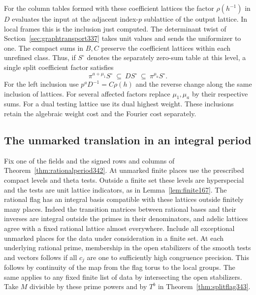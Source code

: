 \documentclass[a4paper,11pt]{article}
\theoremstyle{definition}
\theoremstyle{remark}
\numberwithin{equation}{section}
\begin{document}
For the column tables formed with these coefficient lattices the
factor \(\rho(h^{-1})\) in \(D\) evaluates the input at the adjacent
index-\(p\) sublattice of the output lattice. In local frames this
is the inclusion just computed. The determinant twist of
Section~\ref{sec:graphtransport337} takes unit values and sends the
uniformizer to one. The compact sums in \(B,C\) preserve the
coefficient lattices within each unrefined class. Thus, if \(S^\circ\)
denotes the separately zero-sum table at this level, a single split
coefficient factor satisfies
\[
             \pi^{a+\mu_1} S^\circ\ \subseteq\ D S^\circ
                                      \ \subseteq\ \pi^{\mu_a}S^\circ .
\]
For the left inclusion use \(p^aD^{-1}=C\rho(h)\) and the reverse
change along the same inclusion of lattices. For several affected
factors replace \(\mu_1,\mu_a\) by their respective sums. For a
dual testing lattice use its dual highest weight. These inclusions
retain the algebraic weight cost and the Fourier cost separately.


\subsection{The unmarked translation in an integral period}\label{sec:splittranslation343}
Fix one of the fields and the signed rows and columns of
Theorem~\ref{thm:rationalperiod342}. At unmarked finite places use
the prescribed compact levels and theta tests. Outside a finite set
these levels are hyperspecial and the tests are unit lattice
indicators, as in Lemma~\ref{lem:finite167}. The rational flag has an
integral basis compatible with these lattices outside finitely many
places. Indeed the transition matrices between rational bases and
their inverses are integral outside the primes in their denominators,
and adelic lattices agree with a fixed rational lattice almost
everywhere. Include all exceptional unmarked places for the data
under consideration in a finite set. At each underlying rational
prime, membership in the open stabilizers of the smooth tests and
vectors follows if all $c_j$ are one to sufficiently high congruence
precision. This follows by continuity of the map from the flag torus
to the local groups. The same applies to any fixed finite list of
data by intersecting the open stabilizers. Take $M$ divisible by
these prime powers and by $T^b$ in Theorem~\ref{thm:splitflag343}.
\end{document}
